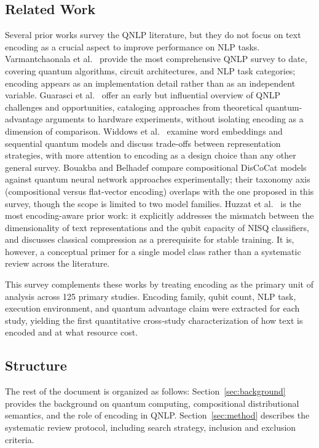 \documentclass{ieeeaccess}
\begin{document}
\subsection{Related Work}
Several prior works survey the QNLP literature, but they do not focus on text encoding as a crucial aspect to improve performance on NLP tasks. Varmantchaonala et al.\ \cite{varmantchaonala_quantum_2024} provide the most comprehensive QNLP survey to date, covering quantum algorithms, circuit architectures, and NLP task categories; encoding appears as an implementation detail rather than as an independent variable. Guarasci et al.\ \cite{guarasci_quantum_2022} offer an early but influential overview of QNLP challenges and opportunities, cataloging approaches from theoretical quantum-advantage arguments to hardware experiments, without isolating encoding as a dimension of comparison. Widdows et al.\ \cite{widdows_quantum_2024} examine word embeddings and sequential quantum models and discuss trade-offs between representation strategies, with more attention to encoding as a design choice than any other general survey. Bouakba and Belhadef \cite{bouakba_comparative_2025} compare compositional DisCoCat models against quantum neural network approaches experimentally; their taxonomy axis (compositional versus flat-vector encoding) overlaps with the one proposed in this survey, though the scope is limited to two model families. Huzzat et al.\ \cite{huzzat_primer_2026} is the most encoding-aware prior work: it explicitly addresses the mismatch between the dimensionality of text representations and the qubit capacity of NISQ classifiers, and discusses classical compression as a prerequisite for stable training. It is, however, a conceptual primer for a single model class rather than a systematic review across the literature.

This survey complements these works by treating encoding as the primary unit of analysis across 125 primary studies. Encoding family, qubit count, NLP task, execution environment, and quantum advantage claim were extracted for each study, yielding the first quantitative cross-study characterization of how text is encoded and at what resource cost.

\subsection{Structure}
The rest of the document is organized as follows: Section~\ref{sec:background} provides the background on quantum computing, compositional distributional semantics, and the role of encoding in QNLP. Section~\ref{sec:method} describes the systematic review protocol, including search strategy, inclusion and exclusion criteria. 
\end{document}
